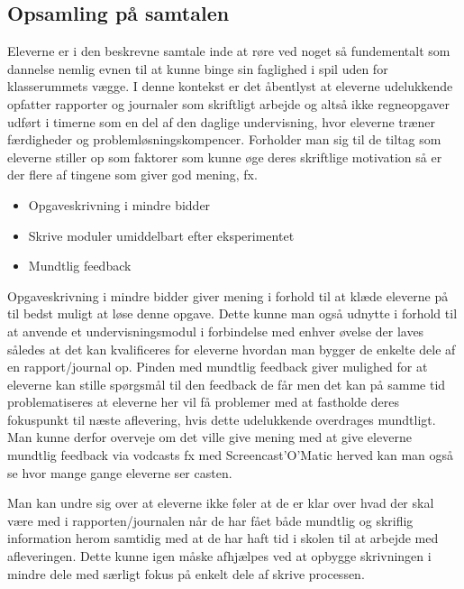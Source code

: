\subsection*{Opsamling på samtalen}
Eleverne er i den beskrevne samtale inde at røre ved noget så fundementalt som dannelse nemlig evnen til at kunne binge sin faglighed i spil uden for klasserummets vægge. I denne kontekst er det åbentlyst at eleverne udelukkende opfatter rapporter og journaler som skriftligt arbejde og altså ikke regneopgaver udført i timerne som en del af den daglige undervisning, hvor eleverne træner færdigheder og problemløsningskompencer. Forholder man sig til de tiltag som eleverne stiller op som faktorer som kunne øge deres skriftlige motivation så er der flere af tingene som giver god mening, fx.
\begin{itemize}
	\item Opgaveskrivning i mindre bidder \vspace{-15pt}
	\item Skrive moduler umiddelbart efter eksperimentet\vspace{-15pt}
	\item Mundtlig feedback
\end{itemize}
Opgaveskrivning i mindre bidder giver mening i forhold til at klæde eleverne på til bedst muligt at løse denne opgave. Dette kunne man også udnytte i forhold til at anvende et undervisningsmodul i forbindelse med enhver øvelse der laves således at det kan kvalificeres for eleverne hvordan man bygger de enkelte dele af en rapport/journal op. 
Pinden med mundtlig feedback giver mulighed for at eleverne kan stille spørgsmål til den feedback de får men det kan på samme tid problematiseres at eleverne her vil få problemer med at fastholde deres fokuspunkt til næste aflevering, hvis dette udelukkende overdrages mundtligt. Man kunne derfor overveje om det ville give mening med at give eleverne mundtlig feedback via vodcasts fx med Screencast'O'Matic herved kan man også se hvor mange gange eleverne ser casten.

Man kan undre sig over at eleverne ikke føler at de er klar over hvad der skal være med i rapporten/journalen når de har fået både mundtlig og skriflig information herom samtidig med at de har haft tid i skolen til at arbejde med afleveringen. Dette kunne igen måske afhjælpes ved at opbygge skrivningen i mindre dele med særligt fokus på enkelt dele af skrive processen.

